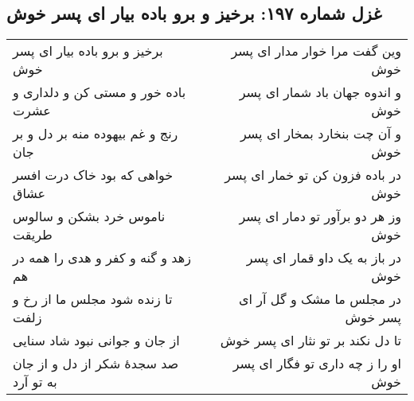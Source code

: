 \begin{center}
\section*{غزل شماره ۱۹۷: برخیز و برو باده بیار ای پسر خوش}
\label{sec:197}
\begin{longtable}{l p{0.5cm} r}
برخیز و برو باده بیار ای پسر خوش
&&
وین گفت مرا خوار مدار ای پسر خوش
\\
باده خور و مستی کن و دلداری و عشرت
&&
و اندوه جهان باد شمار ای پسر خوش
\\
رنج و غم بیهوده منه بر دل و بر جان
&&
و آن چت بنخارد بمخار ای پسر خوش
\\
خواهی که بود خاک درت افسر عشاق
&&
در باده فزون کن تو خمار ای پسر خوش
\\
ناموس خرد بشکن و سالوس طریقت
&&
وز هر دو برآور تو دمار ای پسر خوش
\\
زهد و گنه و کفر و هدی را همه در هم
&&
در باز به یک داو قمار ای پسر خوش
\\
تا زنده شود مجلس ما از رخ و زلفت
&&
در مجلس ما مشک و گل آر ای پسر خوش
\\
از جان و جوانی نبود شاد سنایی
&&
تا دل نکند بر تو نثار ای پسر خوش
\\
صد سجدهٔ شکر از دل و از جان به تو آرد
&&
او را ز چه داری تو فگار ای پسر خوش
\\
\end{longtable}
\end{center}
